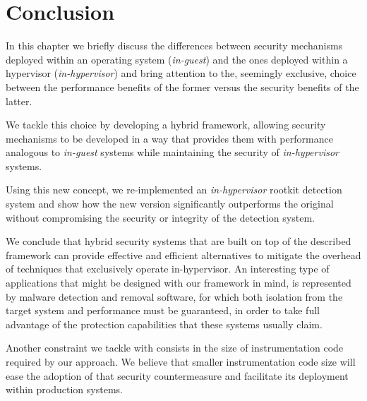 \section{Conclusion}\label{hf:conclusion}
In this chapter we briefly discuss the differences between security mechanisms 
deployed within an operating system (\textit{in-guest}) and the ones deployed 
within a hypervisor (\textit{in-hypervisor}) and bring attention to the, 
seemingly exclusive, choice between the performance benefits of the former 
versus the security benefits of the latter. 

We tackle this choice by developing a hybrid framework, allowing security mechanisms 
to be developed in a way that provides them with performance analogous to \textit{in-guest} 
systems while maintaining the security of \textit{in-hypervisor} systems. 

Using this new concept, we re-implemented an \textit{in-hypervisor} rootkit detection
system and show how the new version significantly outperforms the original
without compromising the security or integrity of the detection system.

We conclude that hybrid security systems that are built on top of the described 
framework can provide effective and efficient alternatives to mitigate the
overhead of techniques that exclusively operate in-hypervisor.
An interesting type of applications that might be designed with our framework in mind, is represented by malware
detection and removal software, for which both isolation from the target system and 
performance must be guaranteed, in order to take full advantage of the protection capabilities that these systems usually claim.

Another constraint we tackle with consists in the size of instrumentation code required 
by our approach. We believe that smaller instrumentation code size will ease the 
adoption of that security countermeasure and facilitate its deployment within production 
systems.

